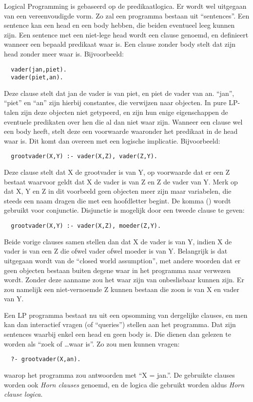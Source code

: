 Logical Programming is gebaseerd op de predikaatlogica. Er wordt wel uitgegaan van een vereenvoudigde vorm. Zo zal een programma bestaan uit ``sentences''. Een sentence kan een head en een body hebben, die beiden eventueel leeg kunnen zijn. 
Een sentence met een niet-lege head wordt een clause genoemd, en definieert wanneer een bepaald predikaat waar is. Een clause zonder body stelt dat zijn head zonder meer waar is. Bijvoorbeeld: \begin{Verbatim}
  vader(jan,piet).
  vader(piet,an).
\end{Verbatim}
Deze clause stelt dat jan de vader is van piet, en piet de vader van an. ``jan'', ``piet'' en ``an'' zijn hierbij constantes, die verwijzen naar objecten. In pure LP-talen zijn deze objecten niet getypeerd, en zijn hun enige eigenschappen de eventuele predikaten over hen die al dan niet waar zijn. Wanneer een clause wel een body heeft, stelt deze een voorwaarde waaronder het predikaat in de head waar is. Dit komt dan overeen met een logische implicatie. Bijvoorbeeld: \begin{Verbatim}
  grootvader(X,Y) :- vader(X,Z), vader(Z,Y).
\end{Verbatim}
Deze clause stelt dat X de grootvader is van Y, op voorwaarde dat er een Z bestaat waarvoor geldt dat X de vader is van Z en Z de vader van Y. Merk op dat X, Y en Z in dit voorbeeld geen objecten meer zijn maar variabelen, die steeds een naam dragen die met een hoofdletter begint. De komma (\code{,}) wordt gebruikt voor conjunctie. Disjunctie is mogelijk door een tweede clause te geven: \begin{Verbatim}
  grootvader(X,Y) :- vader(X,Z), moeder(Z,Y).
\end{Verbatim}
Beide vorige clauses samen stellen dan dat X de vader is van Y, indien X de vader is van een Z die ofwel vader ofwel moeder is van Y. Belangrijk is dat uitgegaan wordt van de ``closed world assumption'', met andere woorden dat er geen objecten bestaan buiten degene waar in het programma naar verwezen wordt. Zonder deze aanname zou het waar zijn van  onbeslisbaar kunnen zijn. Er zou namelijk een niet-vernoemde Z kunnen bestaan die zoon is van X en vader van Y.

Een LP programma bestaat nu uit een opsomming van dergelijke clauses, en men kan dan interactief vragen (of ``queries'') stellen aan het programma. Dat zijn sentences waarbij enkel een head en geen body is. Die dienen dan gelezen te worden als ``zoek of \ldots waar is''. Zo zou men kunnen vragen: \begin{Verbatim}
  ?- grootvader(X,an).
\end{Verbatim}
waarop het programma zou antwoorden met ``X = jan.''. De gebruikte clauses worden ook {\em Horn clauses} genoemd, en de logica die gebruikt worden aldus {\em Horn clause logica}.

